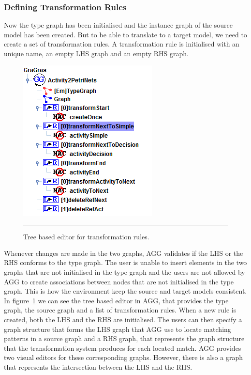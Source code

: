 \subsubsection*{Defining Transformation Rules}
\label{sec:AGG_rules}
Now the type graph has been initialised and the instance graph of the
source model has been created. But to be able to translate to a target model,
we need to create a set of transformation rules. A transformation rule is
initialised with an unique name, an empty LHS graph and an empty RHS graph. 

\begin{figure}[H]
	\centering
	\includegraphics[scale=0.7]{figures/AGGTreeBasedEditor.png}
	\rule{35em}{0.5pt}
	\caption[Tree based editor in AGG]
	{Tree based editor for transformation rules.}
	\label{fig:AGGTreeBasedEditor}
\end{figure}

Whenever changes are made in the two graphs, AGG validates if the LHS or the RHS
conforms to the type graph. The user is unable to insert elements in the two
graphs that are not initialised in the type graph and the users are not allowed
by AGG to create associations between nodes that are not initialised in the type
graph. This is how the environment keep the source and target models consistent.
In figure~\ref{fig:AGGTreeBasedEditor} we can see the tree based editor in AGG,
that provides the type graph, the source graph and a list of transformation
rules. When a new rule is created, both the LHS and the RHS are initialised. The
users can then specify a graph structure that forms the LHS graph that AGG use
to locate matching patterns in a source graph and a RHS graph, that represents
the graph structure that the transformation system produces for each located match.
AGG provides two visual editors for these corresponding graphs. However, there
is also a graph that represents the intersection between the LHS and the RHS.


